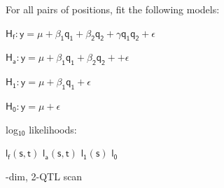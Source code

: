 \documentclass[12pt]{article}
\newcommand{\headsize}{\fontsize{35}{35} \selectfont}
\newcommand{\smallsize}{\fontsize{25}{30} \selectfont}
\begin{document}
\hfill \begin{minipage}[t]{10in}
For all pairs of positions, fit the following models:

\vspace{10mm}

\hfill
\begin{minipage}{9in}
{\color{myblue}
$\mathsf{\text{H}_f: y = \mu + \beta_1 q_1 + \beta_2 q_2 +
      \gamma q_1 q_2 + \epsilon}$

\vspace{5mm}

$\mathsf{\text{H}_a: y = \mu + \beta_1 q_1 + \beta_2 q_2 +
      + \epsilon}$

\vspace{5mm}

$\mathsf{\text{H}_1: y = \mu + \beta_1 q_1 + \epsilon}$

\vspace{5mm}

$\mathsf{\text{H}_0: y = \mu + \epsilon}$

}
\end{minipage}

\vspace{20mm}

log$_{\mathsf{10}}$ likelihoods:

\vspace{5mm}

\hfill
\begin{minipage}{9in}
{\color{myblue}

$\mathsf{l_f(s,t)}$ \hspace{2cm}
$\mathsf{l_a(s,t)}$ \hspace{2cm}
$\mathsf{l_1(s)}$ \hspace{2cm}
$\mathsf{l_0}$ \hspace{2cm}
}
\end{minipage}


\end{minipage}


\newpage

\headsize \color{myyellow}
\hfill \begin{minipage}{5.75in}
-dim, 2-QTL scan 
\end{minipage}

\vspace{2cm}

\color{mywhite} \smallsize
\end{document}

